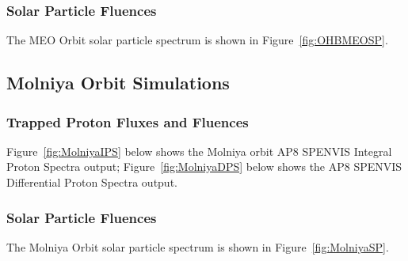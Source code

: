 \documentclass[11pt]{article}
\begin{document}
\subsubsection{Solar Particle Fluences}
The MEO Orbit solar particle spectrum is shown in Figure~\ref{fig:OHBMEOSP}.


\subsection{Molniya Orbit Simulations}

\subsubsection{Trapped Proton Fluxes and Fluences}

 Figure~\ref{fig:MolniyaIPS} below shows the Molniya orbit AP8 SPENVIS Integral Proton Spectra output; Figure~\ref{fig:MolniyaDPS} below shows the AP8 SPENVIS Differential Proton Spectra output.

\subsubsection{Solar Particle Fluences}

The Molniya Orbit solar particle spectrum is shown in Figure~\ref{fig:MolniyaSP}.
\end{document}
